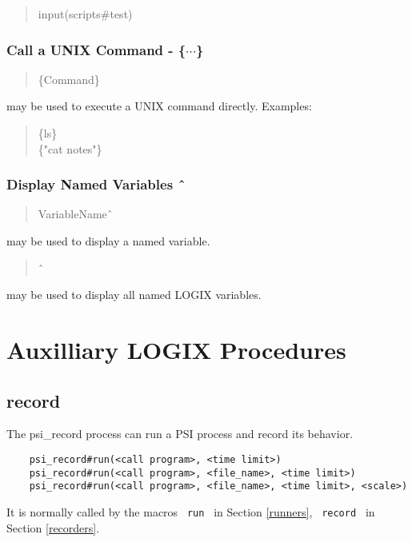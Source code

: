 \begin{verse}
    input(scripts\#test)
\end{verse}

\subsection{Call a UNIX Command - \{$\cdots$\}}

\begin{verse}
    \{Command\}
\end{verse}

\noindent
may be used to execute a UNIX command directly.  Examples:

\begin{verse}
    \{ls\} \\
    \{"cat notes"\}
\end{verse}

\subsection{Display Named Variables \^\ }

\begin{verse}
    VariableName\^\ 
\end{verse}

\noindent
may be used to display a named variable.

\begin{verse}
    \^\ 
\end{verse}

\noindent
may be used to display all named LOGIX variables.

\chapter{Auxilliary LOGIX Procedures}
\label{auxilliary}

\section{record}
\label{record}
The psi\_record process can run a PSI process
and record its behavior.

\begin{verbatim}
    psi_record#run(<call program>, <time limit>)
    psi_record#run(<call program>, <file_name>, <time limit>)
    psi_record#run(<call program>, <file_name>, <time limit>, <scale>)
\end{verbatim}

\noindent
It is normally called by the macros \verb+ run + in Section
\ref{runners}, \verb+ record + in Section \ref{recorders}.

